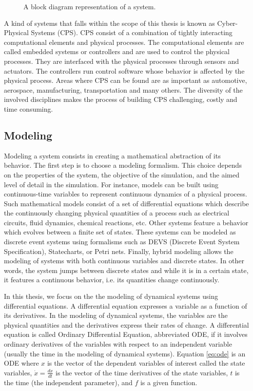 \begin{figure}[phbt]
\centering

\caption{A block diagram representation of a system.}
\label{fig:system}
\end{figure}

A kind of systems that falls within the scope of this thesis is known as Cyber-Physical Systems (CPS). CPS consist of a combination of tightly interacting computational elements and physical processes. The computational elements are called embedded systems or controllers and are used to control the physical processes. They are interfaced with the physical processes through sensors and actuators. The controllers run control software whose behavior is affected by the physical process. Areas where CPS can be found are as important as automotive, aerospace, manufacturing, transportation and many others. The diversity of the involved disciplines makes the process of building CPS challenging, costly and time consuming.

\subsection{Modeling}

Modeling a system consists in creating a mathematical abstraction of its behavior. The first step is to choose a modeling formalism. This choice depends on the properties of the system, the objective of the simulation, and the aimed level of detail in the simulation. For instance, models can be built using continuous-time variables to represent continuous dynamics of a physical process. Such mathematical models consist of a set of differential equations which describe the continuously changing physical quantities of a process such as electrical circuits, fluid dynamics, chemical reactions, etc. Other systems feature a behavior which evolves between a finite set of states. These systems can be modeled as discrete event systems using formalisms such as DEVS (Discrete Event System Specification), Statecharts, or Petri nets. Finally, hybrid modeling allows the modeling of systems with both continuous variables and discrete states. In other words, the system jumps between discrete states and while it is in a certain state, it features a continuous behavior, i.e. its quantities change continuously. 

In this thesis, we focus on the the modeling of dynamical systems using differential equations. A differential equation expresses a variable as a function of its derivatives. In the modeling of dynamical systems, the variables are the physical quantities and the derivatives express their rates of change. A differential equation is called Ordinary Differential Equation, abbreviated ODE, if it involves ordinary derivatives of the variables with respect to an independent variable (usually the time in the modeling of dynamical systems).  Equation \ref{eq:ode} is an ODE where $x$ is the vector of the dependent variables of interest called the state variables, $\dot{x} = \frac{dx}{dt}$ is the vector of the time derivatives of the state variables, $t$ is the time (the independent parameter), and $f$ is a given function.

